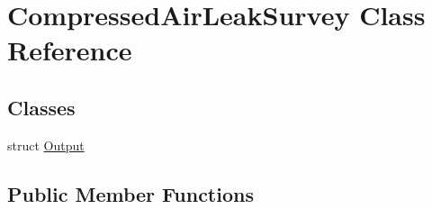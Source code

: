 \hypertarget{class_compressed_air_leak_survey}{}\section{Compressed\+Air\+Leak\+Survey Class Reference}
\label{class_compressed_air_leak_survey}
\subsection*{Classes}
\begin{DoxyCompactItemize}
\item 
struct \hyperlink{struct_compressed_air_leak_survey_1_1_output}{Output}
\end{DoxyCompactItemize}
\subsection*{Public Member Functions}
